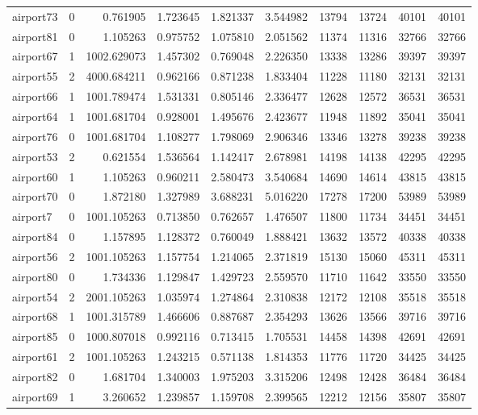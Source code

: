 \begin{longtable}{|l|r|r|r|r|r|r|r|r|r|}
airport73 & 0 & 0.761905 & 1.723645 & 1.821337 & 3.544982 & 13794 & 13724 & 40101 & 40101 \\
airport81 & 0 & 1.105263 & 0.975752 & 1.075810 & 2.051562 & 11374 & 11316 & 32766 & 32766 \\
airport67 & 1 & 1002.629073 & 1.457302 & 0.769048 & 2.226350 & 13338 & 13286 & 39397 & 39397 \\
airport55 & 2 & 4000.684211 & 0.962166 & 0.871238 & 1.833404 & 11228 & 11180 & 32131 & 32131 \\
airport66 & 1 & 1001.789474 & 1.531331 & 0.805146 & 2.336477 & 12628 & 12572 & 36531 & 36531 \\
airport64 & 1 & 1001.681704 & 0.928001 & 1.495676 & 2.423677 & 11948 & 11892 & 35041 & 35041 \\
airport76 & 0 & 1001.681704 & 1.108277 & 1.798069 & 2.906346 & 13346 & 13278 & 39238 & 39238 \\
airport53 & 2 & 0.621554 & 1.536564 & 1.142417 & 2.678981 & 14198 & 14138 & 42295 & 42295 \\
airport60 & 1 & 1.105263 & 0.960211 & 2.580473 & 3.540684 & 14690 & 14614 & 43815 & 43815 \\
airport70 & 0 & 1.872180 & 1.327989 & 3.688231 & 5.016220 & 17278 & 17200 & 53989 & 53989 \\
airport7 & 0 & 1001.105263 & 0.713850 & 0.762657 & 1.476507 & 11800 & 11734 & 34451 & 34451 \\
airport84 & 0 & 1.157895 & 1.128372 & 0.760049 & 1.888421 & 13632 & 13572 & 40338 & 40338 \\
airport56 & 2 & 1001.105263 & 1.157754 & 1.214065 & 2.371819 & 15130 & 15060 & 45311 & 45311 \\
airport80 & 0 & 1.734336 & 1.129847 & 1.429723 & 2.559570 & 11710 & 11642 & 33550 & 33550 \\
airport54 & 2 & 2001.105263 & 1.035974 & 1.274864 & 2.310838 & 12172 & 12108 & 35518 & 35518 \\
airport68 & 1 & 1001.315789 & 1.466606 & 0.887687 & 2.354293 & 13626 & 13566 & 39716 & 39716 \\
airport85 & 0 & 1000.807018 & 0.992116 & 0.713415 & 1.705531 & 14458 & 14398 & 42691 & 42691 \\
airport61 & 2 & 1001.105263 & 1.243215 & 0.571138 & 1.814353 & 11776 & 11720 & 34425 & 34425 \\
airport82 & 0 & 1.681704 & 1.340003 & 1.975203 & 3.315206 & 12498 & 12428 & 36484 & 36484 \\
airport69 & 1 & 3.260652 & 1.239857 & 1.159708 & 2.399565 & 12212 & 12156 & 35807 & 35807 \\

\end{longtable}
